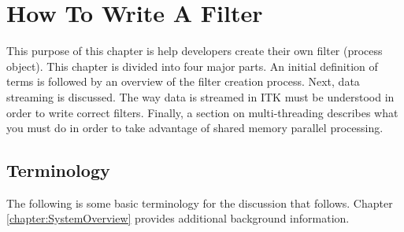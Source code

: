 \chapter{How To Write A Filter}
\label{chapter:WriteAFilter}

This purpose of this chapter is help developers create their own
filter (process object).  This chapter is divided into four major
parts. An initial definition of terms is followed by an overview of
the filter creation process. Next, data streaming is discussed. The
way data is streamed in ITK must be understood in order to write
correct filters. Finally, a section on multi-threading describes what
you must do in order to take advantage of shared memory parallel
processing.

\section{Terminology}
\label{sec:Terminology}

The following is some basic terminology for the discussion that follows.
Chapter \ref{chapter:SystemOverview} provides additional background
information.

